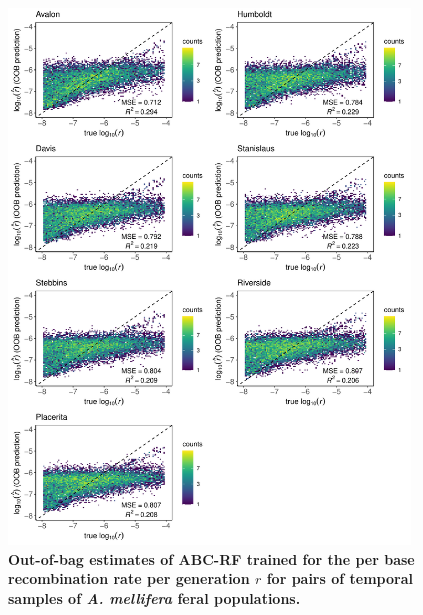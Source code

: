\documentclass[a4paper, 12pt]{article}
\begin{document}
\begin{figure}[ht]
  \centering
  \includegraphics[width=0.95\textwidth]{Figures/FigureS23_combined_plot_rr.pdf}
  \small\caption{\textbf{Out-of-bag estimates of ABC-RF trained for the per base recombination rate per generation $r$ for pairs of temporal samples of \textit{A. mellifera} feral populations.}}
  \label{fig:supple_feralbee_r}
\end{figure}
\end{document}
